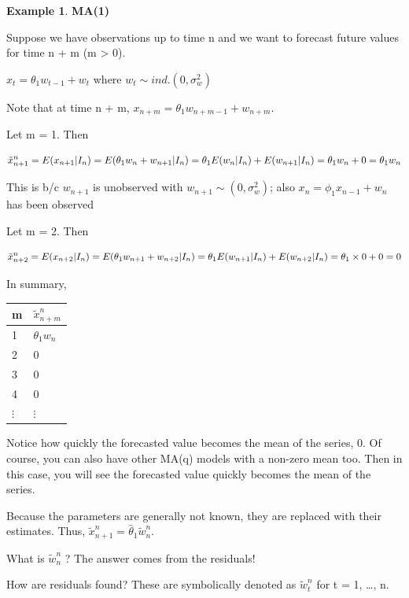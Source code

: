 \documentclass[
]{book}
\theoremstyle{definition}
\theoremstyle{definition}
\newtheorem{example}{Example}[chapter]
\theoremstyle{definition}
\theoremstyle{definition}
\theoremstyle{remark}
\begin{document}
\begin{example}
\textbf{MA(1)}

Suppose we have observations up to time n and we want to forecast future values for time n + m (m \textgreater{} 0).

\(x_t=\theta_1w_{t-1}+w_t\) where \(w_t \sim ind.(0, \sigma_w^2)\)

Note that at time n + m, \(x_{n+m} = \theta_1w_{n+m-1} + w_{n+m}\).

Let m = 1. Then

\[\tilde x^n_{n+1}=E(x_{n+1}| I_n)\\
=E(\theta_1w_n+w_{n+1}| I_n)\\
=\theta_1E(w_n| I_n)+ E(w_{n+1}| I_n)\\
=\theta_1w_n+0=\theta_1w_n\]

This is b/c \(w_{n+1}\) is unobserved with
\(w_{n+1} \sim(0,\sigma_w^2)\); also \(x_n = \phi_1x_{n-1} + w_n\) has been observed

Let m = 2. Then

\[\tilde x_{n+2}^n=E(x_{n+2}| I_n)\\
=E(\theta_1w_{n+1}+w_{n+2}| I_n)\\
=\theta_1E(w_{n+1}| I_n)+E(w_{n+2}|I_n)\\
=\theta_1 \times 0 +0=0\]

In summary,

\begin{longtable}[]{@{}ll@{}}
\toprule()
m & \(\tilde x^n_{n+m}\) \\
\midrule()
\endhead
1 & \(\theta_1w_n\) \\
2 & 0 \\
3 & 0 \\
4 & 0 \\
\(\vdots\) & \(\vdots\) \\
\bottomrule()
\end{longtable}

Notice how quickly the forecasted value becomes the mean of the series, 0. Of course, you can also have other MA(q) models with a non-zero mean too. Then in this case, you will see the forecasted value quickly becomes the mean of the series.

Because the parameters are generally not known, they are replaced with their estimates. Thus, \(\tilde x^n_{n+1} = \hat \theta_1 \tilde w^n_n.\)

What is \(\tilde w^n_n\) ? The answer comes from the residuals!

How are residuals found? These are symbolically denoted as \(\tilde w_t^n\) for t = 1, \ldots, n.~


\end{example}
\end{document}
